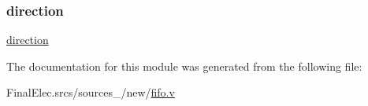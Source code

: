 \subsubsection{\texorpdfstring{direction}{direction}}
{\footnotesize\ttfamily \mbox{\hyperlink{enumfifo_a45c919098335b7a3b1089494455d9fcb}{direction}} \hspace{0.3cm}{\ttfamily [Signal]}}



The documentation for this module was generated from the following file\+:\begin{DoxyCompactItemize}
\item 
Final\+Elec.\+srcs/sources\+\_/new/\mbox{\hyperlink{fifo_8v}{fifo.\+v}}\end{DoxyCompactItemize}
